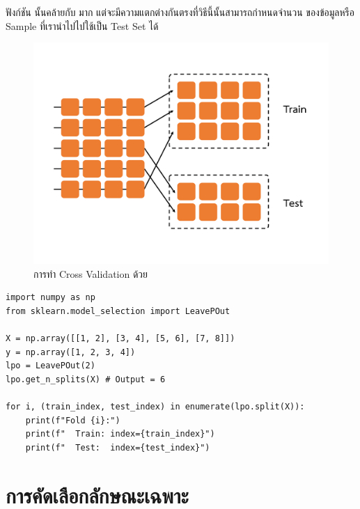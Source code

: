 ฟังก์ชัน  นั้นคล้ายกับ  มาก แต่จะมีความแตกต่างกันตรงที่วิธีนี้นั้นสามารถกำหนดจำนวน%
ของข้อมูลหรือ Sample ที่เรานำไปไปใช้เป็น Test Set ได้

\begin{figure}[H]
    \centering
    \includegraphics[width=0.9\linewidth,page=6]{fig/cross_validation.pdf}
    \caption{การทำ Cross Validation ด้วย }
    \label{fig:leave_p_out}
\end{figure}

\begin{lstlisting}[style=MyPython]
import numpy as np
from sklearn.model_selection import LeavePOut

X = np.array([[1, 2], [3, 4], [5, 6], [7, 8]])
y = np.array([1, 2, 3, 4])
lpo = LeavePOut(2)
lpo.get_n_splits(X) # Output = 6

for i, (train_index, test_index) in enumerate(lpo.split(X)):
    print(f"Fold {i}:")
    print(f"  Train: index={train_index}")
    print(f"  Test:  index={test_index}")
\end{lstlisting}

\section{การคัดเลือกลักษณะเฉพาะ}
\label{sec:select_feat}

